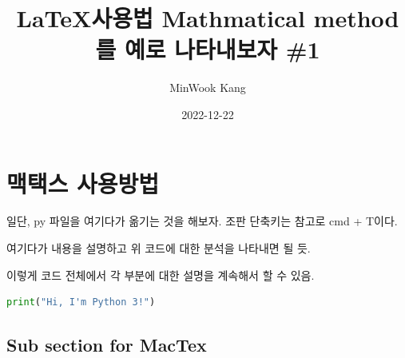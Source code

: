 \documentclass[a4paper,12pt]{article} %
\title{\LaTeX 사용법 \space{} Mathmatical method를 예로 나타내보자 \#1}
\author{MinWook Kang}
\date{2022-12-22} %
\begin{document}
\maketitle %

\section{맥택스 사용방법} %
일단, py 파일을 여기다가 옮기는 것을 해보자. 조판 단축키는 참고로 cmd + T이다.


\vspace{5mm}

\vspace{5mm}


\noindent %
여기다가 내용을 설명하고 위 코드에 대한 분석을 나타내면 될 듯.


\vspace{5mm}

\vspace{5mm}

\noindent 
이렇게 코드 전체에서 각 부분에 대한 설명을 계속해서 할 수 있음.

\clearpage

\vspace{5mm}
\begin{lstlisting}[language=Python]
print("Hi, I'm Python 3!")
\end{lstlisting}
\vspace{5mm}

\subsection{Sub section for MacTex} %

\vspace{2mm} %

\vspace{2mm}
\end{document}
